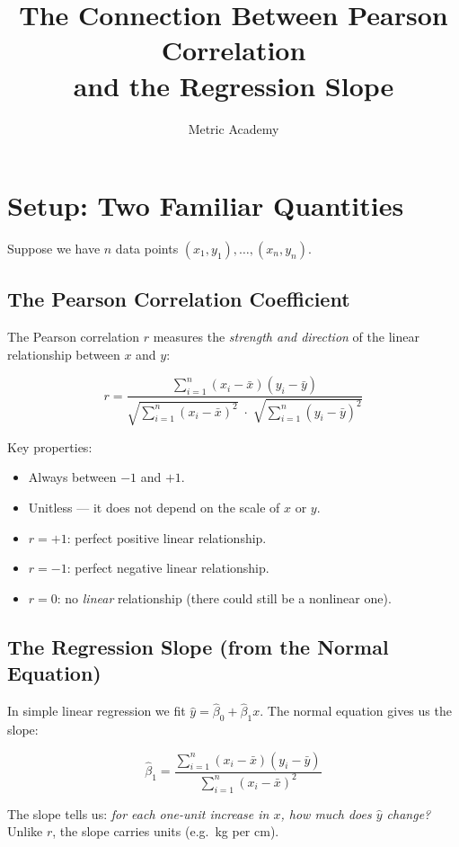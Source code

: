 \documentclass[11pt,a4paper]{article}
\title{\textbf{The Connection Between Pearson Correlation\\and the Regression Slope}}
\author{Metric Academy}
\date{}
\begin{document}
\maketitle

\section{Setup: Two Familiar Quantities}

Suppose we have $n$ data points $(x_1, y_1), \dots, (x_n, y_n)$.

\subsection*{The Pearson Correlation Coefficient}

The Pearson correlation $r$ measures the \emph{strength and direction} of the
linear relationship between $x$ and $y$:

\[
r = \frac{\sum_{i=1}^{n}(x_i - \bar{x})(y_i - \bar{y})}
         {\sqrt{\sum_{i=1}^{n}(x_i - \bar{x})^2} \;\cdot\;
          \sqrt{\sum_{i=1}^{n}(y_i - \bar{y})^2}}
\]

Key properties:
\begin{itemize}[nosep]
  \item Always between $-1$ and $+1$.
  \item Unitless --- it does not depend on the scale of $x$ or $y$.
  \item $r = +1$: perfect positive linear relationship.
  \item $r = -1$: perfect negative linear relationship.
  \item $r = 0$: no \emph{linear} relationship (there could still be a nonlinear one).
\end{itemize}

\subsection*{The Regression Slope (from the Normal Equation)}

In simple linear regression we fit $\hat{y} = \hat{\beta}_0 + \hat{\beta}_1 x$.
The normal equation gives us the slope:

\[
\hat{\beta}_1
= \frac{\sum_{i=1}^{n}(x_i - \bar{x})(y_i - \bar{y})}
       {\sum_{i=1}^{n}(x_i - \bar{x})^2}
\]

The slope tells us: \emph{for each one-unit increase in $x$, how much does
$\hat{y}$ change?} Unlike $r$, the slope carries units (e.g.\ kg per cm).
\end{document}
